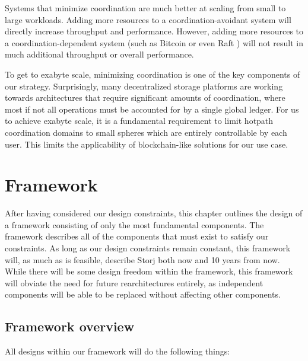 \documentclass[8pt,fleqn,openany]{book}
\begin{document}
Systems that minimize coordination are
much better at scaling from small
to large workloads. Adding more resources to a coordination-avoidant system
will directly increase throughput and performance. However,
adding more resources to a coordination-dependent system
(such as Bitcoin \cite{bitcoin} or even Raft \cite{raft}) will not result in
much additional throughput or overall performance.

To get to exabyte scale, minimizing coordination is one of the key components
of our strategy.
Surprisingly, many decentralized storage platforms are working towards
architectures that require significant amounts of coordination,
where most if not all operations must be accounted for by a single global
ledger. For us to achieve exabyte scale, it is a fundamental requirement to
limit hotpath coordination domains to small spheres which are entirely
controllable by each user.
This limits the applicability of blockchain-like solutions for our use case.

\chapter{Framework}\label{chap:framework}

After having considered our design constraints, this chapter outlines the
design of a framework consisting of only the most fundamental components.
The framework describes
all of the components that must exist to satisfy our constraints.
As long as our design constraints remain constant, this framework will, as
much as is feasible, describe Storj both now and 10 years from now.
While there will be some design freedom within the framework,
this framework will obviate the need for future rearchitectures entirely, as
independent components will be able to be replaced without affecting other
components.

\section{Framework overview}

All designs within our framework will do the following things:
\end{document}
